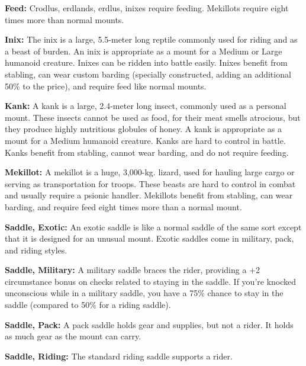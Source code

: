 \textbf{Feed:} Crodlus, erdlands, erdlus, inixes require feeding. Mekillots require eight times more than normal mounts.

\textbf{Inix:} The inix is a large, 5.5-meter long reptile commonly used for riding and as a beast of burden. An inix is appropriate as a mount for a Medium or Large humanoid creature. Inixes can be ridden into battle easily. Inixes benefit from stabling, can wear custom barding (specially constructed, adding an additional 50\% to the price), and require feed like normal mounts.

\textbf{Kank:} A kank is a large, 2.4-meter long insect, commonly used as a personal mount. These insects cannot be used as food, for their meat smells atrocious, but they produce highly nutritious globules of honey. A kank is appropriate as a mount for a Medium humanoid creature. Kanks are hard to control in battle. Kanks benefit from stabling, cannot wear barding, and do not require feeding.

\textbf{Mekillot:} A mekillot is a huge, 3,000-kg. lizard, used for hauling large cargo or serving as transportation for troops. These beasts are hard to control in combat and usually require a psionic handler. Mekillots benefit from stabling, can wear barding, and require feed eight times more than a normal mount.

\textbf{Saddle, Exotic:} An exotic saddle is like a normal saddle of the same sort except that it is designed for an unusual mount. Exotic saddles come in military, pack, and riding styles.

\textbf{Saddle, Military:} A military saddle braces the rider, providing a +2 circumstance bonus on  checks related to staying in the saddle. If you're knocked unconscious while in a military saddle, you have a 75\% chance to stay in the saddle (compared to 50\% for a riding saddle).

\textbf{Saddle, Pack:} A pack saddle holds gear and supplies, but not a rider. It holds as much gear as the mount can carry.

\textbf{Saddle, Riding:} The standard riding saddle supports a rider.